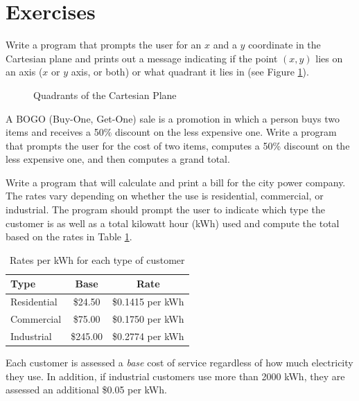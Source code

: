 

\section{Exercises}

\begin{exer}
Write a program that prompts the user for an $x$ and a $y$ coordinate 
in the Cartesian plane and prints out a message indicating if the point 
$(x,y)$ lies on an axis ($x$ or $y$ axis, or both) or what quadrant it lies 
in (see Figure \ref{fig:Quadrants}).

\begin{figure}[h]
  \centering
 
 \caption{Quadrants of the Cartesian Plane}
 \label{fig:Quadrants}
\end{figure}
\end{exer}

\begin{exer}
A BOGO (Buy-One, Get-One) sale is a promotion in which a person buys two
items and receives a 50\% discount on the less expensive one.  Write a program
that prompts the user for the cost of two items, computes a 50\% discount
on the less expensive one, and then computes a grand total.
\end{exer}

\begin{exer}
Write a program that will calculate and print a bill for the city power
company.  The rates vary depending on whether the use is residential,
commercial, or industrial.  The program should prompt the user to 
indicate which type the customer is as well as a total kilowatt hour (kWh)
used and compute the total based on the rates in Table \ref{table:kwhRates}.

\begin{table}[h]
\centering
\begin{tabular}{l|c|c}
\hline
Type & Base & Rate \\
\hline\hline
Residential & \$24.50 & \$0.1415 per kWh \\
Commercial & \$75.00 & \$0.1750 per kWh \\
Industrial & \$245.00 & \$0.2774 per kWh
\end{tabular}
\caption{Rates per kWh for each type of customer}
\label{table:kwhRates}
\end{table}

Each customer is assessed a \emph{base} cost of service regardless of how
much electricity they use.  In addition, if industrial customers use more than 
2000 kWh, they are assessed an additional \$0.05 per kWh.
\end{exer}

